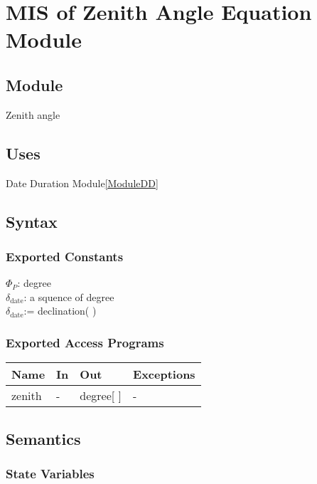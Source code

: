 \documentclass[12pt, titlepage]{article}
\begin{document}
\section{MIS of Zenith Angle Equation Module} \label{ModuleZA} 

\subsection{Module}
Zenith angle


\subsection{Uses}
Date Duration Module\ref{ModuleDD}


\subsection{Syntax}

\subsubsection{Exported Constants}
$\Phi_{P}$: degree\\
$\delta_{\text{date}}$: a squence of degree\\
$\delta_{\text{date}}$:= declination( ) 

\subsubsection{Exported Access Programs}

\begin{center}
\begin{tabular}{p{2cm} p{4cm} p{4cm} p{2cm}}
\hline
\textbf{Name} & \textbf{In} & \textbf{Out} & \textbf{Exceptions} \\
\hline 
zenith &  -  & degree[ ] & - \\

\hline
\end{tabular}
\end{center}


\subsection{Semantics}

\subsubsection{State Variables}
\end{document}
